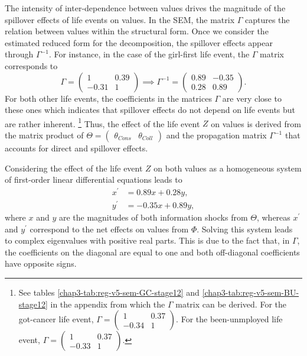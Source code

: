The intensity of inter-dependence between values drives the magnitude of the spillover effects of life events on values. In the SEM, the matrix $\Gamma$ captures the relation between values within the structural form. Once we consider the estimated reduced form for the decomposition, the spillover effects appear through $\Gamma^{-1}$. For instance, in the case of the girl-first life event, the $\Gamma$ matrix corresponds to
\begin{equation*}
    \Gamma = \begin{pmatrix}1 & 0.39 \\ -0.31 & 1\end{pmatrix} \implies \Gamma^{-1} = \begin{pmatrix}0.89 & -0.35 \\ 0.28 & 0.89\end{pmatrix}.
\end{equation*}
For both other life events, the coefficients in the matrices $\Gamma$ are very close to these ones which indicates that spillover effects do not depend on life events but are rather inherent.%
\footnote{See tables \ref{chap3-tab:reg-v5-sem-GC-stage12} and \ref{chap3-tab:reg-v5-sem-BU-stage12} in the appendix from which the $\Gamma$ matrix can be derived. For the got-cancer life event, $\Gamma = \begin{pmatrix}1 & 0.37 \\ -0.34 & 1\end{pmatrix}$. For the been-unmployed life event, $\Gamma = \begin{pmatrix}1 & 0.37 \\ -0.33 & 1\end{pmatrix}$.}
Thus, the effect of the life event $Z$ on values is derived from the matrix product of $\Theta = \begin{pmatrix} \theta_{Cons} & \theta_{Coll} \end{pmatrix}$ and the propagation matrix $\Gamma^{-1}$ that accounts for direct and spillover effects.

Considering the effect of the life event $Z$ on both values as a homogeneous system of first-order linear differential equations leads to
\begin{align*}
    x^\prime &= 0.89 x + 0.28 y,\\
    y^\prime &= -0.35 x + 0.89 y,
\end{align*}
where $x$ and $y$ are the magnitudes of both information shocks from $\Theta$, whereas $x^\prime$ and $y^\prime$ correspond to the net effects on values from $\Phi$. Solving this system leads to complex eigenvalues with positive real parts. This is due to the fact that, in $\Gamma$, the coefficients on the diagonal are equal to one and both off-diagonal coefficients have opposite signs. 

